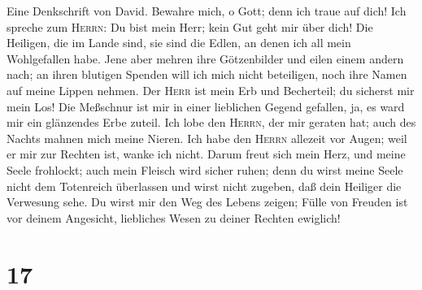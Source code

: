  Eine Denkschrift von David. Bewahre mich, o Gott; denn
ich traue auf dich!  Ich spreche zum \textsc{Herrn}: Du
bist mein Herr; kein Gut geht mir über dich!  Die
Heiligen, die im Lande sind, sie sind die Edlen, an denen ich all mein
Wohlgefallen habe.  Jene aber mehren ihre Götzenbilder und
eilen einem andern nach; an ihren blutigen Spenden will ich mich nicht
beteiligen, noch ihre Namen auf meine Lippen nehmen.  Der
\textsc{Herr} ist mein Erb und Becherteil; du sicherst mir mein Los!
 Die Meßschnur ist mir in einer lieblichen Gegend
gefallen, ja, es ward mir ein glänzendes Erbe zuteil.  Ich
lobe den \textsc{Herrn}, der mir geraten hat; auch des Nachts mahnen
mich meine Nieren.  Ich habe den \textsc{Herrn} allezeit
vor Augen; weil er mir zur Rechten ist, wanke ich nicht. 
Darum freut sich mein Herz, und meine Seele frohlockt; auch mein Fleisch
wird sicher ruhen;  denn du wirst meine Seele nicht dem
Totenreich überlassen und wirst nicht zugeben, daß dein Heiliger die
Verwesung sehe.  Du wirst mir den Weg des Lebens zeigen;
Fülle von Freuden ist vor deinem Angesicht, liebliches Wesen zu deiner
Rechten ewiglich!

\hypertarget{section-16}{%
\section{17}\label{section-16}}

